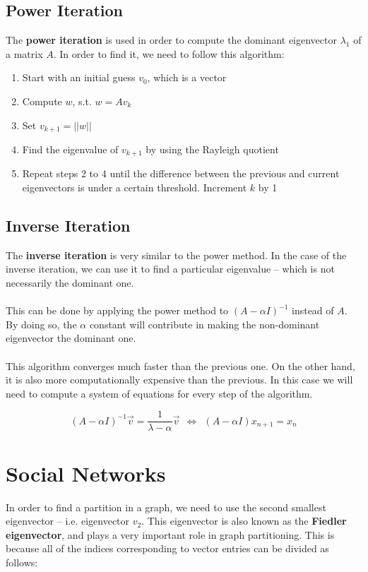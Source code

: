 \documentclass{article}
\begin{document}
\subsection{Power Iteration}
The \textbf{power iteration} is used in order to compute the dominant eigenvector $\lambda_1$ of a matrix $A$. In order to find it, we need to follow this algorithm:

\begin{enumerate}
	\item Start with an initial guess $v_0$, which is a vector
	\item Compute $w$, s.t. $w = Av_k$
	\item Set $v_{k+1} = ||w||$
	\item Find the eigenvalue of $v_{k+1}$ by using the Rayleigh quotient
	\item Repeat steps 2 to 4 until the difference between the previous and current eigenvectors is under a certain threshold. Increment $k$ by 1
\end{enumerate}

\subsection{Inverse Iteration}
The \textbf{inverse iteration} is very similar to the power method. In the case of the inverse iteration, we can use it to find a particular eigenvalue -- which is not necessarily the dominant one. \\ \\
This can be done by applying the power method to $(A-\alpha I)^{-1}$ instead of $A$. By doing so, the $\alpha$ constant will contribute in making the non-dominant eigenvector the dominant one. \\ \\
This algorithm converges much faster than the previous one. On the other hand, it is also more computationally expensive than the previous. In this case we will need to compute a system of equations for every step of the algorithm.

\[ (A-\alpha I)^{-1} \overrightarrow{v} = \frac{1}{\lambda - \alpha}\overrightarrow{v}~~ \iff ~~(A-\alpha I) x_{n+1} = x_n \]

\section{Social Networks}
In order to find a partition in a graph, we need to use the second smallest eigenvector -- i.e. eigenvector $v_2$. This eigenvector is also known as the \textbf{Fiedler eigenvector}, and plays a very important role in graph partitioning. This is because all of the indices corresponding to vector entries can be divided as follows:
\end{document}
